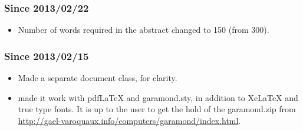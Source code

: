 \documentclass{cslthse-msc}
\begin{document}
\begin{appendices}
\subsubsection{Since 2013/02/22}
\begin{itemize}
\item Number of words required in the abstract changed to 150 (from 300).
\end{itemize}

\subsubsection{Since 2013/02/15}
\begin{itemize}
\item Made a separate document class, for clarity.
\item made it work with pdfLaTeX and garamond.sty, in addition to XeLaTeX and true type fonts. It is up to the user to get the hold of the garamond.zip from \url{http://gael-varoquaux.info/computers/garamond/index.html}.
\end{itemize}
\end{appendices}
\end{document}
